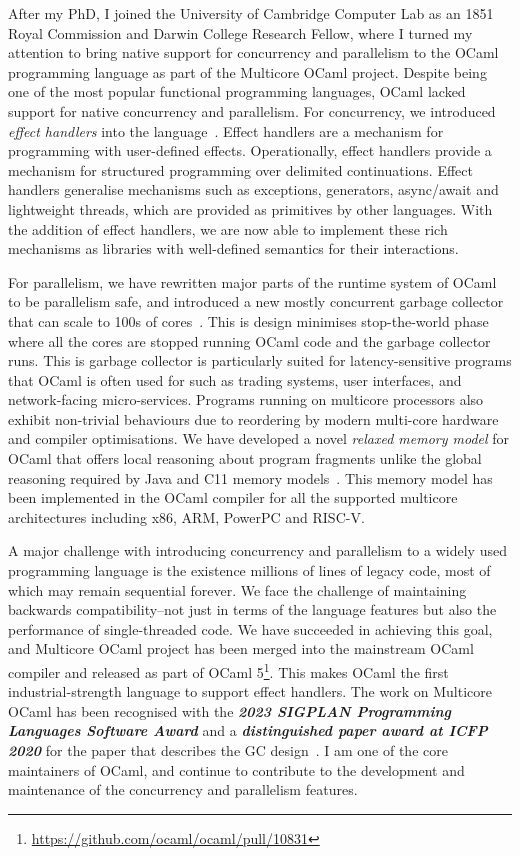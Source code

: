 \documentclass[screen,acmsmall,nonacm]{acmart}
\newcommand{\loud}[1]{\textbf{\textit{#1}}}
\begin{document}
After my PhD, I joined the University of Cambridge Computer Lab as an 1851
Royal Commission and Darwin College Research Fellow, where I turned my
attention to bring native support for concurrency and parallelism to the OCaml
programming language as part of the Multicore OCaml project. Despite being one
of the most popular functional programming languages, OCaml lacked support for
native concurrency and parallelism. For concurrency, we introduced \emph{effect
handlers} into the language~\cite{RetroEffects}. Effect handlers are a
mechanism for programming with user-defined effects. Operationally, effect
handlers provide a mechanism for structured programming over delimited
continuations. Effect handlers generalise mechanisms such as exceptions,
generators, async/await and lightweight threads, which are provided as
primitives by other languages. With the addition of effect handlers, we are now
able to implement these rich mechanisms as libraries with well-defined
semantics for their interactions.

For parallelism, we have rewritten major parts of the runtime system of OCaml
to be parallelism safe, and introduced a new mostly concurrent garbage
collector that can scale to 100s of cores~\cite{RetroParallel}. This is design
minimises stop-the-world phase where all the cores are stopped running OCaml
code and the garbage collector runs. This is garbage collector is particularly
suited for latency-sensitive programs that OCaml is often used for such as
trading systems, user interfaces, and network-facing micro-services. Programs
running on multicore processors also exhibit non-trivial behaviours due to
reordering by modern multi-core hardware and compiler optimisations. We have
developed a novel \emph{relaxed memory model} for OCaml that offers local
reasoning about program fragments unlike the global reasoning required by Java
and C11 memory models~\cite{LDRF}. This memory model has been implemented in
the OCaml compiler for all the supported multicore architectures including x86,
ARM, PowerPC and RISC-V.

A major challenge with introducing concurrency and parallelism to a widely used
programming language is the existence millions of lines of legacy code, most of
which may remain sequential forever. We face the challenge of maintaining
backwards compatibility--not just in terms of the language features but also
the performance of single-threaded code. We have succeeded in achieving this
goal, and Multicore OCaml project has been merged into the mainstream OCaml
compiler and released as part of OCaml
5\footnote{\url{https://github.com/ocaml/ocaml/pull/10831}}. This makes OCaml
the first industrial-strength language to support effect handlers. The work on
Multicore OCaml has been recognised with the \loud{2023 SIGPLAN Programming
Languages Software Award} and a \loud{distinguished paper award at ICFP 2020}
for the paper that describes the GC design~\cite{RetroParallel}. I am one of
the core maintainers of OCaml, and continue to contribute to the development
and maintenance of the concurrency and parallelism features.
\end{document}
